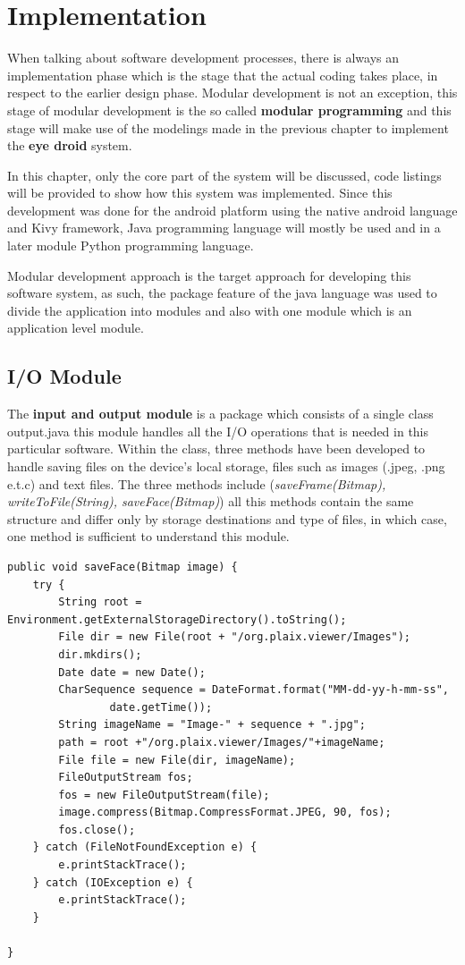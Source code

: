 \chapter{Implementation}
When talking about software development processes, there is always an implementation phase which is the stage that the actual coding takes place, in respect to the earlier design phase. Modular development is not an exception, this stage of modular development is the so called {\bf modular programming} and this stage will make use of the modelings made in the previous chapter to implement the {\bf eye droid} system.

In this chapter, only the core part of the system will be discussed, code listings will be provided to show how this system was implemented. Since this development was done for the android platform using the native android language and Kivy framework, Java programming language will mostly be used and in a later module Python programming language.

Modular development approach is the target approach for developing this software system, as such, the package feature of the java language was used to divide the application into modules and also with one module which is an application level module.

\section{I/O Module}
The {\bf input and output module} is a package which consists of a single class {output.java} this module handles all the I/O operations that is needed in this particular software. Within the class, three methods have been developed to handle saving files on the device's local storage, files such as images (.jpeg, .png e.t.c) and text files. The three methods include ({\it saveFrame(Bitmap), writeToFile(String), saveFace(Bitmap)}) all this methods contain the same structure and differ only by storage destinations and type of files, in which case, one method is sufficient to understand this module. 

\begin{lstlisting}[label=Saving-a-file-in-device-storage-drive,caption=Saving files in device storage drive]
public void saveFace(Bitmap image) {
	try {
		String root = Environment.getExternalStorageDirectory().toString();
		File dir = new File(root + "/org.plaix.viewer/Images");
		dir.mkdirs();
		Date date = new Date();
		CharSequence sequence = DateFormat.format("MM-dd-yy-h-mm-ss",
				date.getTime());
		String imageName = "Image-" + sequence + ".jpg";
		path = root +"/org.plaix.viewer/Images/"+imageName;
		File file = new File(dir, imageName);
		FileOutputStream fos;
		fos = new FileOutputStream(file);
		image.compress(Bitmap.CompressFormat.JPEG, 90, fos);
		fos.close();
	} catch (FileNotFoundException e) {
		e.printStackTrace();
	} catch (IOException e) {
		e.printStackTrace();
	}

}
\end{lstlisting}

